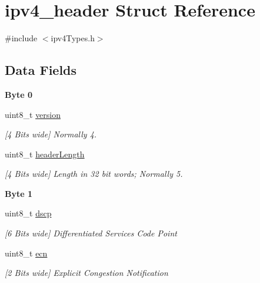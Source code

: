 \hypertarget{structipv4__header}{}\section{ipv4\+\_\+header Struct Reference}
\label{structipv4__header}


{\ttfamily \#include $<$ipv4\+Types.\+h$>$}

\subsection*{Data Fields}
\begin{Indent}\textbf{ Byte 0}\par
\begin{DoxyCompactItemize}
\item 
uint8\+\_\+t \mbox{\hyperlink{structipv4__header_ab22abc2906422da61885ac6c8e6a1a59}{version}}
\begin{DoxyCompactList}\small\item\em \mbox{[}4 Bits wide\mbox{]} Normally 4. \end{DoxyCompactList}\item 
uint8\+\_\+t \mbox{\hyperlink{structipv4__header_abf2b1d816d4e2e459b2ed1bda26cb904}{header\+Length}}
\begin{DoxyCompactList}\small\item\em \mbox{[}4 Bits wide\mbox{]} Length in 32 bit words; Normally 5. \end{DoxyCompactList}\end{DoxyCompactItemize}
\end{Indent}
\begin{Indent}\textbf{ Byte 1}\par
\begin{DoxyCompactItemize}
\item 
uint8\+\_\+t \mbox{\hyperlink{structipv4__header_af6c1c78d408e91d2916add663a491623}{dscp}}
\begin{DoxyCompactList}\small\item\em \mbox{[}6 Bits wide\mbox{]} Differentiated Services Code Point \end{DoxyCompactList}\item 
uint8\+\_\+t \mbox{\hyperlink{structipv4__header_afaf0e7ded50820ba5d7d11464707ce4c}{ecn}}
\begin{DoxyCompactList}\small\item\em \mbox{[}2 Bits wide\mbox{]} Explicit Congestion Notification \end{DoxyCompactList}\end{DoxyCompactItemize}
\end{Indent}
